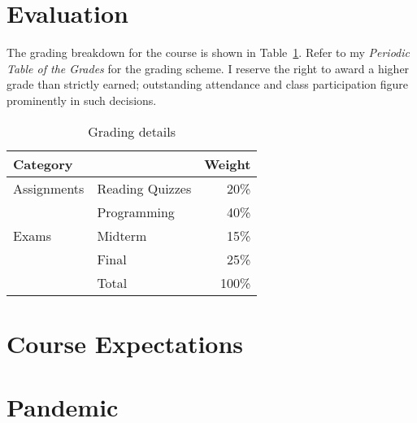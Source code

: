 \documentclass[11pt]{article}
\begin{document}


\section{Evaluation}

The grading breakdown for the course
is shown in Table~\ref{tab:grading}.
Refer to my \emph{Periodic Table of the Grades}
for the grading scheme.
I reserve the right to award a higher grade than strictly earned;
outstanding attendance and class participation
figure prominently in such decisions.

\begin{table}[htb]
  \centering
  \begin{tabular}{llr}
    \toprule
    Category    &                 & Weight \\
    \midrule
    Assignments & Reading Quizzes & 20\%   \\
                & Programming     & 40\%   \\
    Exams       & Midterm         & 15\%   \\
                & Final           & 25\%   \\
    \midrule
                & Total           & 100\%  \\
    \bottomrule
  \end{tabular}
  \caption{Grading details}
  \label{tab:grading}
\end{table}
\begin{comment}
  #+ORGTBL: SEND grades orgtbl-to-latex :splice nil :skip 0 :booktabs t
  | Category    |                 | Weight |
  |             |                 |    <r> |
  |-------------+-----------------+--------|
  | Assignments | Reading Quizzes |    20%
  |             | Programming     |    40%
  | Exams       | Midterm         |    15%
  |             | Final           |    25%
  |-------------+-----------------+--------|
  |             | Total           |   100%
  #+TBLFM: @7$3=100*vsum(@I..II);%
\end{comment}

\section{Course Expectations}



\section{Pandemic}
\end{document}
